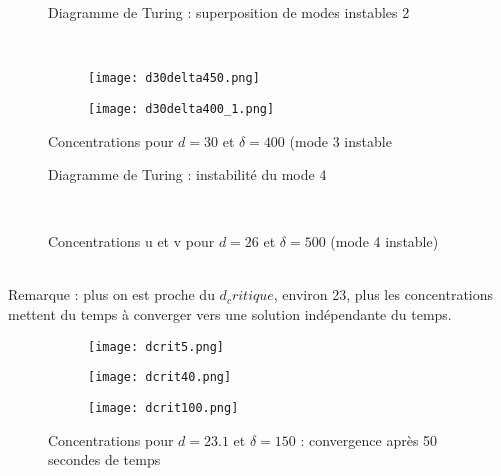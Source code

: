 \documentclass{report}
\begin{document}
\begin{figure}[h!]
\caption{Diagramme de Turing : superposition de modes instables 2}
\label{fig turing3}
\end{figure}\\

\begin{figure}[h!]
  \centering
  \begin{subfigure}[h]{0.4\linewidth}
    \texttt{[image: d30delta450.png]}
  \end{subfigure}
  \begin{subfigure}[h]{0.4\linewidth}
    \texttt{[image: d30delta400\_1.png]}
  \end{subfigure}
  \caption{Concentrations pour $d=30$ et $\delta=400$ (mode 3 instable}
  \label{fig concentration3}
\end{figure}


\begin{figure}[h!]
\caption{Diagramme de Turing : instabilit\'e du mode 4}
\label{fig turing1}
\end{figure}\\


\begin{figure}[h!]
\caption{Concentrations u et v pour $d=26$ et $\delta = 500$ (mode 4 instable)}
\label{fig concentration4}
\end{figure}\\

Remarque : plus on est proche du $d_critique$, environ 23, plus les concentrations mettent du temps \`a converger vers une solution ind\'ependante du temps.\\
\begin{figure}[h!]
  \centering
  \begin{subfigure}[h]{0.4\linewidth}
    \texttt{[image: dcrit5.png]}
  \end{subfigure}
  \begin{subfigure}[h]{0.4\linewidth}
    \texttt{[image: dcrit40.png]}
  \end{subfigure}
	  \begin{subfigure}[h]{0.4\linewidth}
    \texttt{[image: dcrit100.png]}
  \end{subfigure}
  \caption{Concentrations pour $d=23.1$ et $\delta=150$ : convergence apr\`es 50 secondes de temps}
  \label{fig dcrit_tps}
\end{figure}
\end{document}

